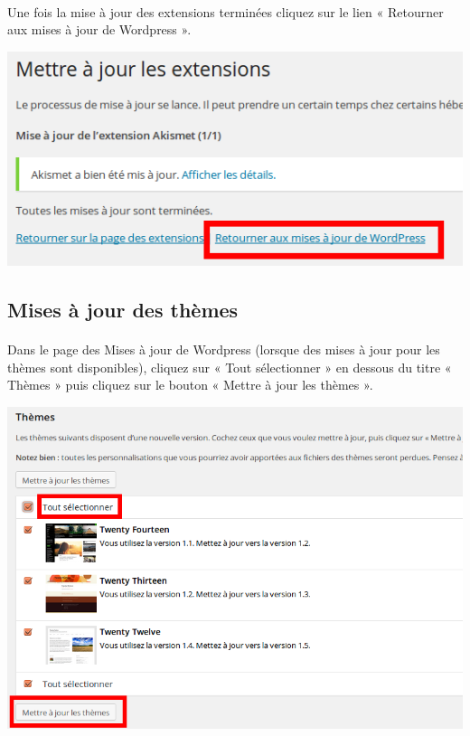 \documentclass[10pt,a4paper]{article}
\begin{document}
\paragraph{}Une fois la mise à jour des extensions terminées cliquez sur le lien « Retourner aux mises à jour de Wordpress ».
\begin{center}
\includegraphics[scale=0.35]{img/0054.png}
\end{center}
\subsection{Mises à jour des thèmes}
\paragraph{}Dans le page des Mises à jour de Wordpress (lorsque des mises à jour pour les thèmes sont disponibles), cliquez sur « Tout sélectionner » en dessous du titre « Thèmes » puis cliquez sur le bouton « Mettre à jour les thèmes ».
\begin{center}
\includegraphics[scale=0.35]{img/0055.png}
\end{center}
\end{document}
